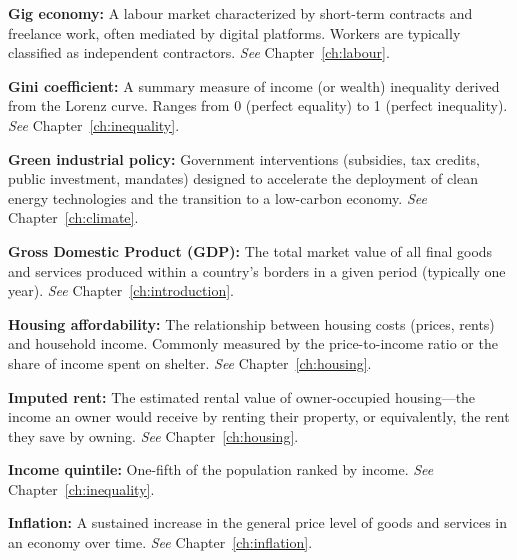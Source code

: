 \vspace{6pt}
\noindent\textbf{Gig economy:} A labour market characterized by short-term contracts and freelance work, often mediated by digital platforms. Workers are typically classified as independent contractors. \textit{See} Chapter~\ref{ch:labour}.

\vspace{6pt}
\noindent\textbf{Gini coefficient:} A summary measure of income (or wealth) inequality derived from the Lorenz curve. Ranges from 0 (perfect equality) to 1 (perfect inequality). \textit{See} Chapter~\ref{ch:inequality}.

\vspace{6pt}
\noindent\textbf{Green industrial policy:} Government interventions (subsidies, tax credits, public investment, mandates) designed to accelerate the deployment of clean energy technologies and the transition to a low-carbon economy. \textit{See} Chapter~\ref{ch:climate}.

\vspace{6pt}
\noindent\textbf{Gross Domestic Product (GDP):} The total market value of all final goods and services produced within a country's borders in a given period (typically one year). \textit{See} Chapter~\ref{ch:introduction}.

\vspace{6pt}
\noindent\textbf{Housing affordability:} The relationship between housing costs (prices, rents) and household income. Commonly measured by the price-to-income ratio or the share of income spent on shelter. \textit{See} Chapter~\ref{ch:housing}.

\vspace{6pt}
\noindent\textbf{Imputed rent:} The estimated rental value of owner-occupied housing---the income an owner would receive by renting their property, or equivalently, the rent they save by owning. \textit{See} Chapter~\ref{ch:housing}.

\vspace{6pt}
\noindent\textbf{Income quintile:} One-fifth of the population ranked by income. \textit{See} Chapter~\ref{ch:inequality}.

\vspace{6pt}
\noindent\textbf{Inflation:} A sustained increase in the general price level of goods and services in an economy over time. \textit{See} Chapter~\ref{ch:inflation}.

